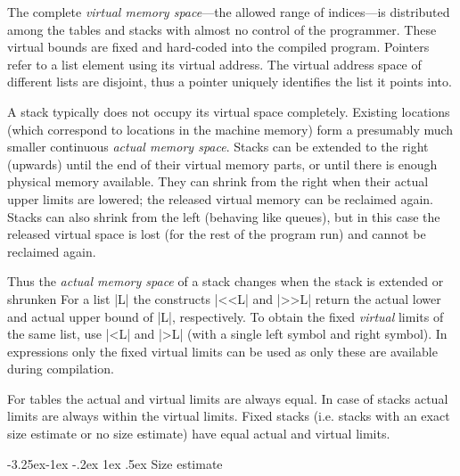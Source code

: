 \documentclass[titlepage]{article}
\makeatletter
\newcommand\g[1]{\textsf{#1}}
\renewcommand\subsection{%
\@startsection{subsection}{2}{\z@}%
   {-3.25ex\@plus -1ex \@minus -.2ex}%
   {1ex \@plus .5ex}%
   {\normalfont\normalsize\bfseries}}
\makeatother
\begin{document}
The complete \emph{virtual memory space}---the allowed range of indices---is
distributed among the tables and stacks with almost no control of the
programmer. These virtual bounds are fixed and hard-coded into the compiled
program. Pointers refer to a list element using its virtual address.
The virtual address space of different lists are disjoint, thus a
pointer uniquely identifies the list it points into.

A stack typically does not occupy its virtual space completely. Existing
locations (which correspond to locations in the machine memory) form a
presumably much smaller continuous \emph{actual memory space}. Stacks can be
extended to the right (upwards) until the end of their virtual memory parts,
or until there is enough physical memory available. They can shrink from the
right when their actual upper limits are lowered; the released virtual
memory can be reclaimed again. Stacks can also shrink from the left
(behaving like queues), but in this case the released virtual space is lost
(for the rest of the program run) and cannot be reclaimed again.

Thus the \emph{actual memory space} of a \g{stack} changes when the stack
is extended or shrunken For a list \pp|L| the constructs \pp|<<L| and
\pp|>>L| return the actual lower and actual upper bound of \pp|L|,
respectively. To obtain the fixed \emph{virtual} limits of the same list,
use \pp|<L| and \pp|>L| (with a single \g{left symbol} and \g{right
symbol}). In expressions only the fixed virtual limits can be used as only
these are available during compilation.

For \g{table}s the actual and virtual limits are always equal. In case of
\g{stack}s actual limits are always within the virtual limits. Fixed stacks
(i.e. stacks with an exact size estimate or no size estimate) have
equal actual and virtual limits.


\subsection{Size estimate}\label{subsec:size-estimate}
\end{document}
